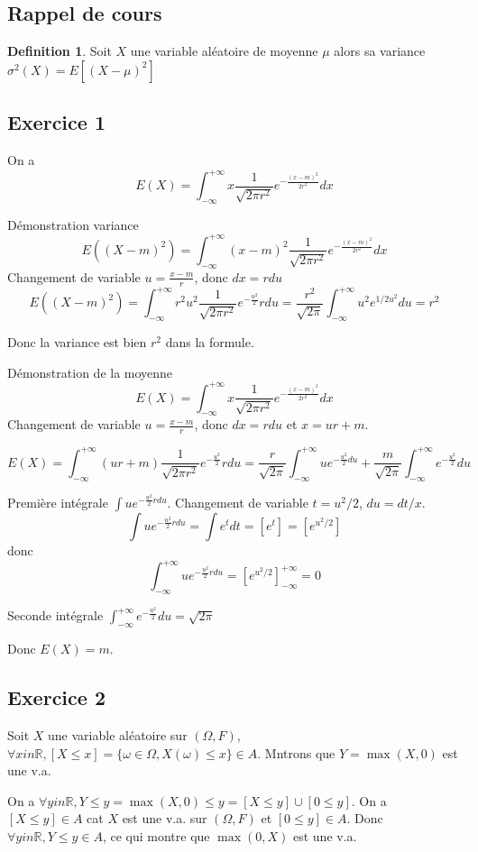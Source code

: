 \documentclass[]{book}
\theoremstyle{definition}
\newtheorem{defn}{Definition}
\newcommand{\bb}[1]{\mathbb{#1}}
\newcommand{\R}{\bb{R}}
\begin{document}
\subsection*{Rappel de cours}
\begin{defn}
Soit $X$ une variable al\'eatoire de moyenne $\mu$ alors sa variance $\sigma^2(X) = E[(X-\mu)^2]$
\end{defn}



\newpage
\subsection*{Exercice 1}
On a 
$$
E(X) = \int_{-\infty}^{+\infty}{x \frac{1}{\sqrt{2\pi r^2}} e^{-\frac{(x-m)^2}{2r^2}} dx}
$$

D\'emonstration variance
$$
E((X-m)^2) = \int_{-\infty}^{+\infty}{(x-m)^2\frac{1}{\sqrt{2\pi r^2}} e^{-\frac{(x-m)^2}{2r^2}} dx}
$$
Changement de variable $u = \frac{x-m}{r}$, donc $dx = rdu$
$$
E((X-m)^2) = \int_{-\infty}^{+\infty}{r^2u^2\frac{1}{\sqrt{2\pi r^2}} e^{-\frac{u^2}{2}} r du} =
\frac{r^2}{\sqrt{2\pi}}\int_{-\infty}^{+\infty}{u^2 e^{1/2u^2}du} = r^2
$$

Donc la variance est bien $r^2$ dans la formule.

D\'emonstration de la moyenne
$$
E(X) = \int_{-\infty}^{+\infty}{x \frac{1}{\sqrt{2\pi r^2}} e^{-\frac{(x-m)^2}{2r^2}} dx}
$$
Changement de variable $u = \frac{x-m}{r}$, donc $dx = rdu$ et $x=ur+m$.

$$
E(X) = \int_{-\infty}^{+\infty}{(ur+m) \frac{1}{\sqrt{2\pi r^2}} e^{-\frac{u^2}{2}} rdu} = 
\frac{r}{\sqrt{2\pi}} \int_{-\infty}^{+\infty}{u e^{-\frac{u^2}{2} du}}  + \frac{m}{\sqrt{2\pi}} \int_{-\infty}^{+\infty}{e^{-\frac{u^2}{2}} du}
$$

Premi\`ere int\'egrale $\int{u e^{-\frac{u^2}{2} rdu}}$. Changement de variable $t = u^2/2$, $du = dt/x$.
$$
\int{u e^{-\frac{u^2}{2} rdu}} = \int{e^t dt} = [e^t] = [e^{u^2/2}]
$$
donc
$$
\int_{-\infty}^{+\infty}{u e^{-\frac{u^2}{2} rdu}} = [e^{u^2/2}]_{-\infty}^{+\infty} = 0
$$

Seconde int\'egrale $\int_{-\infty}^{+\infty}{e^{-\frac{u^2}{2}} du} = \sqrt{2\pi}$

Donc $E(X) = m$.


\subsection*{Exercice 2}
Soit $X$ une variable al\'eatoire sur $(\Omega, F)$,  $\forall x in \R, [X \leq x] = \{\omega \in \Omega, X(\omega) \leq x\} \in A$. Mntrons que $Y = \max(X,0)$ est une v.a.

On a $\forall y in \R, Y \leq y = \max(X,0) \leq y = [X \leq y] \cup [0 \leq y]$. On a $[X \leq y] \in A$ cat $X$ est une v.a. sur $(\Omega, F)$ et $[0 \leq y] \in A$. Donc $\forall y in \R, Y \leq y \in A$, ce qui montre que $\max(0,X)$ est une v.a.
\end{document}
